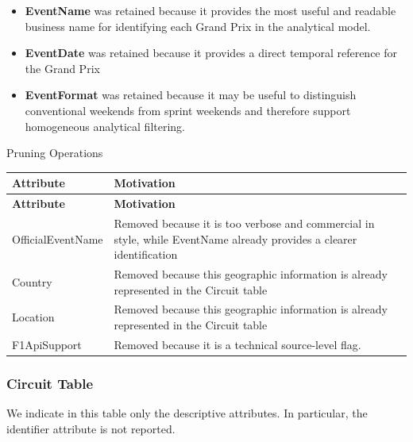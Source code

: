 \documentclass[a4paper,11pt]{article}
\begin{document}
	\begin{itemize}
		\item \textbf{EventName} was retained because it provides the most useful and readable business name for identifying each Grand Prix in the analytical model.
		
		\item \textbf{EventDate} was retained because it provides a direct temporal reference for the Grand Prix 
		
		\item \textbf{EventFormat} was retained because it may be useful to distinguish conventional weekends from sprint weekends and therefore support homogeneous analytical filtering.
	\end{itemize}
	

	Pruning Operations
	
	\begin{longtable}{|p{4.4cm}|p{10.8cm}|}
		\hline
		\textbf{Attribute} & \textbf{Motivation} \\
		\hline
		\endfirsthead
		
		\hline
		\textbf{Attribute} & \textbf{Motivation} \\
		\hline
		\endhead
		
		OfficialEventName & Removed because it is too verbose and commercial in style, while EventName already provides a clearer  identification \\ \hline
		
		Country & Removed because this geographic information is already represented in the Circuit table \\ \hline
		
		Location & Removed because this geographic information is already represented in the Circuit table  \\ \hline
		
		F1ApiSupport & Removed because it is a technical source-level flag. \\ \hline
		
	\end{longtable}
	
	
	
	\subsubsection{Circuit Table}
	
	We indicate in this table only the descriptive attributes. In particular, the identifier attribute is not reported.
	
\end{document}
